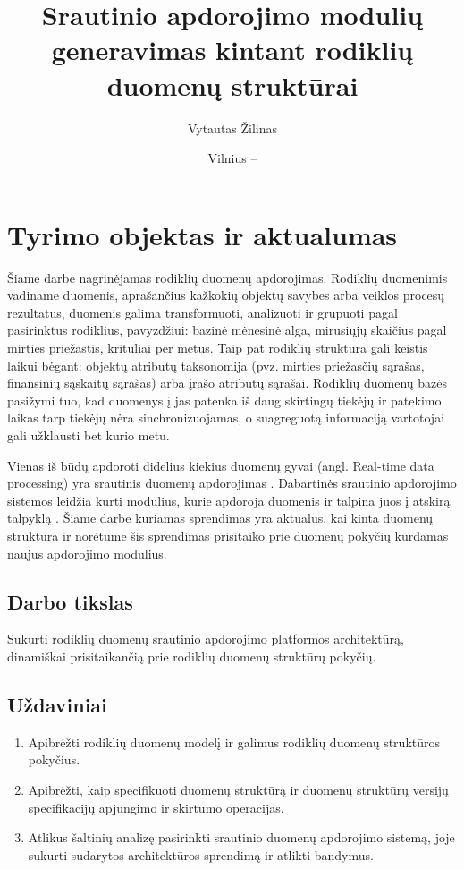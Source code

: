 \documentclass{VUMIFPSbakalaurinis}
\title{Srautinio apdorojimo modulių generavimas kintant rodiklių duomenų struktūrai}
\author{Vytautas Žilinas}
\date{Vilnius – \the\year}
\begin{document}
 
\maketitle

\cleardoublepage{}
\setcounter{page}{2}

\section{Tyrimo objektas ir aktualumas}
Šiame darbe nagrinėjamas rodiklių duomenų apdorojimas. Rodiklių duomenimis vadiname duomenis, aprašančius kažkokių objektų savybes arba veiklos procesų rezultatus, 
duomenis galima transformuoti, analizuoti ir grupuoti pagal pasirinktus rodiklius, 
pavyzdžiui: bazinė mėnesinė alga, mirusiųjų skaičius pagal mirties priežastis, krituliai per metus. Taip pat rodiklių struktūra gali keistis laikui bėgant: 
objektų atributų taksonomija (pvz. mirties priežasčių sąrašas, finansinių sąskaitų sąrašas) arba įrašo atributų sąrašai.
Rodiklių duomenų bazės pasižymi tuo, kad duomenys į jas patenka iš daug skirtingų tiekėjų ir patekimo laikas tarp tiekėjų nėra 
sinchronizuojamas, o suagreguotą informaciją vartotojai gali užklausti bet kurio metu.  \par
Vienas iš būdų apdoroti didelius kiekius duomenų gyvai (angl. Real-time data processing) yra srautinis duomenų apdorojimas \cite{BigData, StreamProcessingInData}. 
Dabartinės srautinio apdorojimo sistemos leidžia kurti modulius, kurie apdoroja duomenis ir talpina juos į atskirą talpyklą \cite{8Requirements}. 
Šiame darbe kuriamas sprendimas yra aktualus, kai kinta duomenų struktūra ir norėtume šis sprendimas prisitaiko 
prie duomenų pokyčių kurdamas naujus apdorojimo modulius.

\subsection{Darbo tikslas}
Sukurti rodiklių duomenų srautinio apdorojimo platformos architektūrą, dinamiškai prisitaikančią prie rodiklių duomenų struktūrų pokyčių.

\subsection{Uždaviniai}
\begin{enumerate}
    \item Apibrėžti rodiklių duomenų modelį ir galimus rodiklių duomenų struktūros pokyčius.
    \item Apibrėžti, kaip specifikuoti duomenų struktūrą ir duomenų struktūrų versijų specifikacijų apjungimo ir skirtumo operacijas.
    \item Atlikus šaltinių analizę pasirinkti srautinio duomenų apdorojimo sistemą, joje sukurti sudarytos architektūros sprendimą ir atlikti bandymus.
\end{enumerate}
\end{document}
